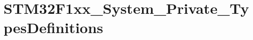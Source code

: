 \hypertarget{group__STM32F1xx__System__Private__TypesDefinitions}{}\section{S\+T\+M32\+F1xx\+\_\+\+System\+\_\+\+Private\+\_\+\+Types\+Definitions}
\label{group__STM32F1xx__System__Private__TypesDefinitions}
